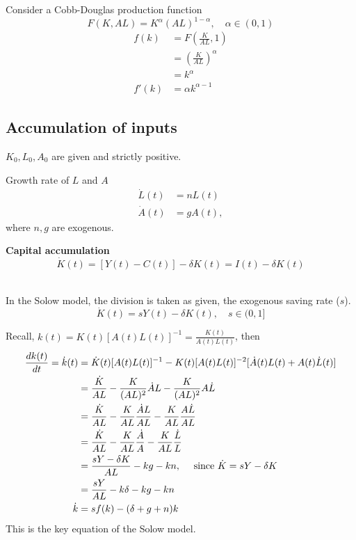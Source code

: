 \documentclass[12pt]{article}
\begin{document}
Consider a Cobb-Douglas production function
\begin{equation*}
F(K,AL) = K^{\alpha}(AL)^{1 - \alpha}, \quad \alpha \in (0,1)
\end{equation*}
\begin{align*}
f(k)&= F \left( \frac{K}{AL}, 1 \right) \\
&= \left( \frac{K}{AL} \right) ^{\alpha}\\
&= k ^{\alpha}\\
f'(k)&= \alpha k ^{\alpha - 1}
\end{align*}




\subsection{Accumulation of inputs}
$ K_0, L_0, A_0 $ are given and strictly positive.

Growth rate of $ L $ and $ A $
\begin{align*}
\dot{L}(t)&= nL(t)\\
\dot{A}(t)&= gA(t),
\end{align*}
where $ n,g $ are exogenous.

{\textbf {Capital accumulation}}
\begin{equation*}
		\dot{K}(t)  = [Y(t) - C(t)] - \delta K(t) = I(t) - \delta K(t)
\end{equation*}

\noindent{}\\


In the Solow model, the division is taken as given, the exogenous saving rate ($ s $).
\begin{equation*}
\dot{K}(t) = sY(t) - \delta K(t), \quad s \in (0,1]
\end{equation*}




Recall, $ k(t) = K(t)[A(t)L(t)]^{ - 1} = \frac{K(t)}{A(t)L(t)} $, then
\begin{align*}
\frac{dk(t)}{dt} = \dot{k}(t)
&= \dot{K}(t)[A(t)L(t)]^{ - 1} - K(t)[A(t)L(t)]^{ - 2}[\dot{A}(t)L(t) + A(t)\dot{L}(t)]
\\
&= \frac{\dot{K}}{AL} - \frac{K}{(AL)^{2}}\dot{A}L - \frac{K}{(AL)^{2}}A\dot{L}\\
&= \frac{\dot{K}}{AL} - \frac{K}{AL}\frac{\dot{A}L}{AL} - \frac{K}{AL}\frac{A\dot{L}}{
AL}\\
&= \frac{\dot{K}}{AL} - \frac{K}{AL}\frac{\dot{A}}{A} - \frac{K}{AL}\frac{\dot{L}}{L}\\
&= \frac{sY - \delta K}{AL} - kg - kn, \quad 
\text{ since $ \dot{K} =  sY - \delta K$ }\\
&= \frac{sY}{AL} - k \delta - kg - kn\\
\dot{k}&= sf(k) - (\delta + g + n)k
\end{align*}
This is the key equation of the Solow model.
\end{document}
